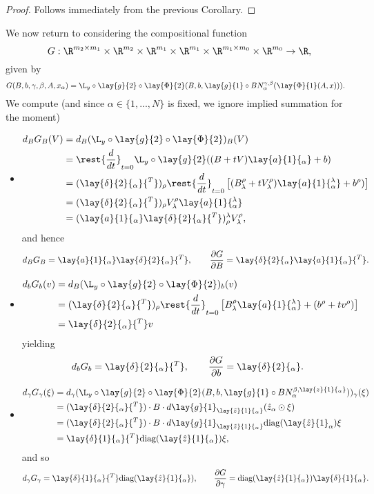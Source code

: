 \begin{proof}
	Follows immediately from the previous Corollary.
\end{proof}



We now return to considering the compositional function
$$G:\R^{m_2\times m_1}\times\R^{m_2}\times\R^{m_1}\times\R^{m_1}\times\R^{m_1\times m_0}\times\R^{m_0}\to\R,$$
given by
\begin{align*}
	G(B,b,\gamma,\beta,A,x_\alpha)&=\L_y\circ\lay{g}{2}\circ\lay{\Phi}{2}(B,b,\lay{g}{1}\circ BN_\alpha^{\gamma,\beta}(\lay{\Phi}{1}(A,x))).
\end{align*}
We compute (and since $\alpha\in\{1,...,N\}$ is fixed, we ignore implied summation for the moment)
\begin{itemize}
	\item \begin{align*}
		d_BG_B(V)&=d_B(\L_y\circ\lay{g}{2}\circ\lay{\Phi}{2})_B(V)\\
		&=\rest{\frac{d}{dt}}_{t=0}\L_y\circ\lay{g}{2}((B+tV)\lay{a}{1}{_\alpha}+b)\\
		&=(\lay{\delta}{2}{_\alpha}{^T})_\rho\rest{\frac{d}{dt}}_{t=0}\left[(B^\rho_\lambda+tV^\rho_\lambda)\lay{a}{1}{^\lambda_\alpha} + b^\rho)\right]\\
		&=(\lay{\delta}{2}{_\alpha}{^T})_\rho V^\rho_\lambda\lay{a}{1}{^\lambda_\alpha}\\
		&=(\lay{a}{1}{_\alpha}\lay{\delta}{2}{_\alpha}{^T})_\rho^\lambda V_\lambda^\rho,
	\end{align*}
	and hence
	$$d_BG_B=\lay{a}{1}{_\alpha}\lay{\delta}{2}{_\alpha}{^T},\qquad \frac{\partial G}{\partial B}=\lay{\delta}{2}{_\alpha}\lay{a}{1}{_\alpha}{^T}.$$
	
	\item \begin{align*}
		d_bG_b(v)&=d_B(\L_y\circ\lay{g}{2}\circ\lay{\Phi}{2})_b(v)\\
		&=(\lay{\delta}{2}{_\alpha}{^T})_\rho\rest{\frac{d}{dt}}_{t=0}\left[B^\rho_\lambda\lay{a}{1}{^\lambda_\alpha}+(b^\rho+tv^\rho)\right]\\
		&=\lay{\delta}{2}{_\alpha}{^T}v
	\end{align*}
	yielding
	$$d_bG_b=\lay{\delta}{2}{_\alpha}{^T},\qquad\frac{\partial G}{\partial b}=\lay{\delta}{2}{_\alpha}.$$
	
	\item \begin{align*}
		d_\gamma G_\gamma(\xi)&=d_\gamma(\L_y\circ\lay{g}{2}\circ\lay{\Phi}{2}(B,b,\lay{g}{1}\circ BN_\alpha^{\beta,\lay{z}{1}{_\alpha}}))_\gamma(\xi)\\
		&=(\lay{\delta}{2}{_\alpha}{^T})\cdot B\cdot d\lay{g}{1}_{\lay{\tilde{z}}{1}{_\alpha}}(\hat{z}_\alpha\odot\xi)\\
		&=(\lay{\delta}{2}{_\alpha}{^T})\cdot B\cdot d\lay{g}{1}_{\lay{\tilde{z}}{1}{_\alpha}}\diag(\lay{\hat{z}}{1}_\alpha)\xi\\
		&=\lay{\delta}{1}{_\alpha}{^T}\diag(\lay{\hat{z}}{1}{_\alpha})\xi,
	\end{align*}
	and so
	$$d_\gamma G_\gamma=\lay{\delta}{1}{_\alpha}{^T}\diag(\lay{\hat{z}}{1}{_\alpha}),\qquad\frac{\partial G}{\partial\gamma}=\diag(\lay{\hat{z}}{1}{_\alpha})\lay{\delta}{1}{_\alpha}.$$
	

\end{itemize}

